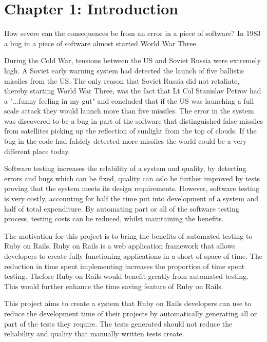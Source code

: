 \documentclass[a4paper,12pt]{article}
\begin{document}
\newpage
\tableofcontents

\newpage	
{}
\section{Chapter 1: Introduction}

\par How severe can the consequences be from an error in a piece of software? In 1983 a bug in a piece of software almost started World War Three.
\vspace{3mm}
\par During the Cold War, tensions between the US and Soviet Russia were extremely high. A Soviet early warning system had detected the launch of five ballistic missiles from the US. The only reason that Soviet Russia did not retaliate, thereby starting World War Three, was the fact that Lt Col Stanislav Petrov had a "...funny feeling in my gut"\cite{ZDNetDisasters} and concluded that if the US was launching a full scale attack they would launch more than five missiles. The error in the system was discovered to be a bug in part of the software that distinguished false missiles from satellites picking up the reflection of sunlight from the top of clouds.\cite{ZDNetDisasters} If the bug in the code had falslely detected more missiles the world could be a very different place today.
\vspace{3mm}
\par Software testing increases the relability of a system and quality, by detecting errors and bugs which can be fixed, quality can aslo be further improved by tests proving that the system meets its design requirements. However, software testing is very costly, accounting for half the time put into development of a system and half of total expenditure.\cite{myers2011art} By automating part or all of the software testing process, testing costs can be reduced, whilst maintaining the benefits.
\vspace{3mm}
\par The motivation for this project is to bring the benefits of automated testing to Ruby on Rails. Ruby on Rails is a web application framework that allows developers to create fully functioning applications in a short of space of time. The reduction in time spent implementing increases the proportion of time spent testing. Thefore Ruby on Rails would benefit greatly from automated testing. This would further enhance the time saving feature of Ruby on Rails.
\vspace{3mm}
\par This project aims to create a system that Ruby on Rails developers can use to reduce the development time of their projects by automatically generating all or part of the tests they require. The tests generated should not reduce the reliability and quality that manually written tests create.
\end{document}
